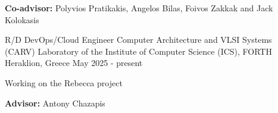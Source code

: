 \begin{cventries}
{\begin{cvitems}
        \item{\textbf{Co-advisor:} Polyvios Pratikakis, Angelos Bilas, Foivos Zakkak and Jack Kolokasis}
      \end{cvitems}
    }
  \cventry
    {R/D DevOps/Cloud Engineer} %
    {Computer Architecture and VLSI Systems (CARV) Laboratory of the Institute of Computer Science (ICS), FORTH} %
    {Heraklion, Greece} %
    {May 2025 - present} %
    {
      \begin{cvitems} %
        \item {Working on the Rebecca project}
        \item{\textbf{Advisor:} Antony Chazapis}
      \end{cvitems}
    }
\end{cventries}
